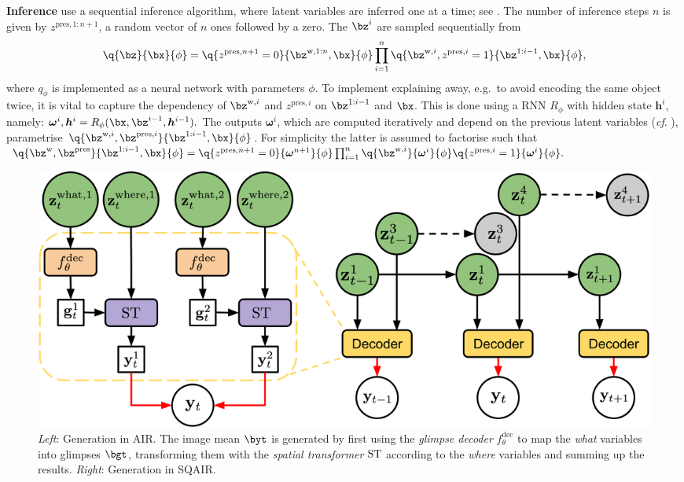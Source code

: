 \textbf{Inference}
\cite{Eslami2016} use a sequential inference algorithm, where latent variables are inferred one at a time; see .
The number of inference steps $n$ is given by $z^{\mathrm{pres}, 1:n+1}$, a random vector of $n$ ones followed by a zero. The $\bz^{i}$ are sampled sequentially from
\vspace{-7pt}
\begin{equation} \label{eq:air_posterior}
    \q{\bz}{\bx}{\phi} = 
        \q{z^{\mathrm{pres}, n+1} = 0}{\bz^{\mathrm{w}, 1:n}, \bx}{\phi} 
        \prod_{i=1}^n 
        \q{\bz^{\mathrm{w}, i}, z^{\mathrm{pres}, i} = 1}{\bz^{1:i-1}, \bx}{\phi},
\end{equation}
where $q_\phi$ is implemented as a neural network with parameters $\phi$. 
To implement explaining away, e.g.\ to avoid encoding the same object twice, it is vital to capture the dependency of $\bz^{\mathrm{w},i}$ and  $z^{\mathrm{pres}, i}$ on $\bz^{1:i-1}$ and $\bx$. This is done using a \gls{RNN} $R_\phi$ with hidden state $\bm{h}^i$, namely:
$
    \bm{\omega}^i, \bm{h}^i = R_\phi (\bx, \bz^{i-1}, \bm{h}^{i-1}).
$
The outputs $\bm{\omega}^i$, which are computed iteratively and depend on the previous latent variables (\textit{cf}. ), parametrise $\q{\bz^{\mathrm{w},i}, \bz^{\mathrm{pres},i}}{\bz^{1:i-1}, \bx}{\phi}$. For simplicity the latter is assumed to factorise such that
$
    \q{\bz^{\mathrm{w}}, \bz^{\mathrm{pres}}}{\bz^{1:i-1}, \bx}{\phi} = \q{z^{\mathrm{pres}, n+1} = 0}{\bm{\omega}^{n+1}}{\phi} \prod_{i=1}^n \q{\bz^{\mathrm{w},i}}{\bm{\omega}^i}{\phi} \q{z^{\mathrm{pres}, i} = 1}{\bm{\omega}^i}{\phi}.
$

\begin{figure}
    \centering
    \includegraphics[width=0.7\linewidth]{figures/SQAIR/air_sqair_generation}
    \caption{
        \textit{Left}:
            Generation in \gls{AIR}.
            The image mean $\byt$ is generated by first using the \textit{glimpse decoder} $f_\theta^\mathrm{dec}$ to map the \textit{what} variables into glimpses $\bgt$, transforming them with the \textit{spatial transformer} $\operatorname{ST}$ according to the \textit{where} variables and summing up the results.
        \textit{Right}:
            Generation in \gls{SQAIR}.
    }
    \label{fig:generation}
\end{figure}

